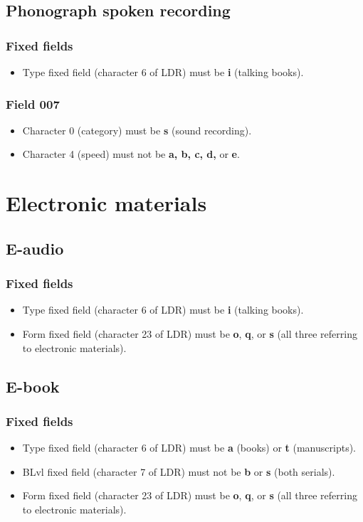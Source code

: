 \documentclass[a4paper,10pt]{amsart}
\let\stdsection\section
\renewcommand\section{\newpage\stdsection}
\begin{document}
\subsection{Phonograph spoken recording}
\subsubsection*{Fixed fields}
\begin{itemize}
 \item Type fixed field (character 6 of LDR) must be {\bf i} (talking books).
\end{itemize}
\subsubsection*{Field 007}
\begin{itemize}
 \item Character 0 (category) must be {\bf s} (sound recording).
 \item Character 4 (speed) must not be {\bf a, b, c, d,} or {\bf e}.
\end{itemize}




\section{Electronic materials}
\subsection{E-audio}
\subsubsection*{Fixed fields}
\begin{itemize}
 \item Type fixed field (character 6 of LDR) must be {\bf i} (talking books).
 \item Form fixed field (character 23 of LDR) must be {\bf o}, {\bf q}, or {\bf s} (all three referring to electronic materials).
\end{itemize}

\subsection{E-book}
\subsubsection*{Fixed fields}
\begin{itemize}
 \item Type fixed field (character 6 of LDR) must be {\bf a} (books) or {\bf t} (manuscripts).
 \item BLvl fixed field (character 7 of LDR) must not be {\bf b} or {\bf s} (both serials).
 \item Form fixed field (character 23 of LDR) must be {\bf o}, {\bf q}, or {\bf s} (all three referring to electronic materials).
\end{itemize}
\end{document}
